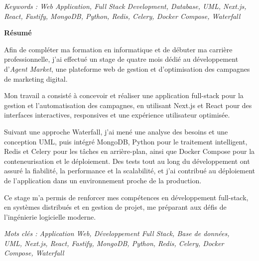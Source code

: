 \documentclass[12pt,a4paper]{report}
\numberwithin{figure}{chapter}
\numberwithin{table}{chapter}
\newcommand{\centeredgreentitle}[1]{%
  \vspace*{0.8cm}%
  \begin{center}
    {\fontsize{24}{28}\selectfont\bfseries\color{titlegreen} #1}
  \end{center}
  \vspace{0.5cm}
}
\newcommand{\addfrontmattertotoc}[1]{\addcontentsline{toc}{chapter}{#1}}
\begin{document}
\vspace{0.5cm}

\begin{center}
{\sffamily\fontsize{14}{18}\selectfont\itshape Keywords : Web Application, Full Stack Development, Database, UML, Next.js, React, Fastify, MongoDB, Python, Redis, Celery, Docker Compose, Waterfall}
\end{center}
\newpage
\centeredgreentitle{Résumé}
\addfrontmattertotoc{Résumé}

\vspace{0.5cm}

{\fontsize{14}{20}\selectfont
Afin de compléter ma formation en informatique et de débuter ma carrière professionnelle, j'ai effectué un stage de quatre mois dédié au développement d'\textit{Agent Market}, une plateforme web de gestion et d'optimisation des campagnes de marketing digital.

Mon travail a consisté à concevoir et réaliser une application full-stack pour la gestion et l'automatisation des campagnes, en utilisant Next.js et React pour des interfaces interactives, responsives et une expérience utilisateur optimisée.

Suivant une approche Waterfall, j'ai mené une analyse des besoins et une conception UML, puis intégré MongoDB, Python pour le traitement intelligent, Redis et Celery pour les tâches en arrière-plan, ainsi que Docker Compose pour la conteneurisation et le déploiement. Des tests tout au long du développement ont assuré la fiabilité, la performance et la scalabilité, et j'ai contribué au déploiement de l'application dans un environnement proche de la production.

Ce stage m'a permis de renforcer mes compétences en développement full-stack, en systèmes distribués et en gestion de projet, me préparant aux défis de l'ingénierie logicielle moderne.
\par}

\vspace{0.8cm}

\begin{center}
{\sffamily\fontsize{14}{18}\selectfont\itshape Mots clés : Application Web, Développement Full Stack, Base de données,\\
UML, Next.js, React, Fastify, MongoDB, Python, Redis, Celery, Docker\\
Compose, Waterfall}
\end{center}
\end{document}
